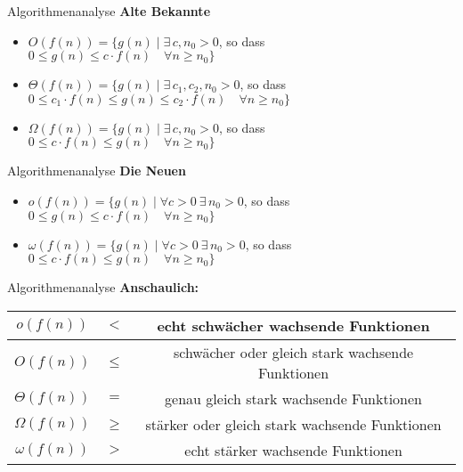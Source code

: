 \begin{frame}{Algorithmenanalyse}
	\textbf{Alte Bekannte} \\[0,125cm]
	\begin{itemize}
		\item $O(f(n)) = \{ g(n) \mid \exists\, c, n_0 > 0$, so dass \\
		\hspace{1,85cm} $ 0 \leq g(n) \leq c \cdot f(n) \quad \forall n \geq n_0 \}$
		\\[0,5cm]
		\item $\Theta (f(n)) = \{ g(n) \mid \exists\, c_1, c_2, n_0 > 0$, so dass \\
		\hspace{1,85cm} $ 0 \leq c_1 \cdot f(n) \leq g(n) \leq c_2 \cdot f(n) \quad \forall n \geq n_0 \}$
		\\[0,5cm]
		\item $\Omega (f(n)) = \{ g(n) \mid \exists\, c, n_0 > 0$, so dass \\
		\hspace{1,85cm} $ 0 \leq c \cdot f(n) \leq g(n) \quad \forall n \geq n_0 \}$
	\end{itemize}
\end{frame}


\begin{frame}{Algorithmenanalyse}
	\textbf{Die Neuen} \\[0,125cm]
	\begin{itemize}
		\item $o(f(n)) = \{g(n) \mid \forall c > 0 \ \exists\, n_0 > 0$, so dass \\
		\hspace{1,85cm} $ 0 \leq g(n) \leq c \cdot f(n) \quad \forall n \geq n_0 \}$
		\\[0,5cm]
		\item $\omega (f(n)) = \{g(n) \mid \forall c > 0 \ \exists\, n_0 > 0$, so dass\\
		\hspace{1,85cm} $ 0 \leq c \cdot f(n) \leq g(n) \quad \forall n \geq n_0 \}$
	\end{itemize}
\end{frame}


\begin{frame}{Algorithmenanalyse}
	\textbf{Anschaulich:} \\[0,125cm]
	{
		
		\renewcommand{\arraystretch}{2}%
		\begin{tabular}{ | c | c | c | }
			\hline
			$     o (f(n))$ & $<$ & echt schwächer wachsende Funktionen
			\\ \hline
			$     O (f(n))$ & $\leq$ & schwächer oder gleich stark wachsende Funktionen
			\\ \hline
			$\Theta (f(n))$ & $=$ & genau gleich stark wachsende Funktionen
			\\ \hline
			$\Omega (f(n))$ & $\geq$ & stärker oder gleich stark wachsende Funktionen
			\\ \hline
			$\omega (f(n))$ & $>$ & echt stärker wachsende Funktionen
			\\ \hline
		\end{tabular}
		\renewcommand{\arraystretch}{\stdarraystretch}
	}
\end{frame}


